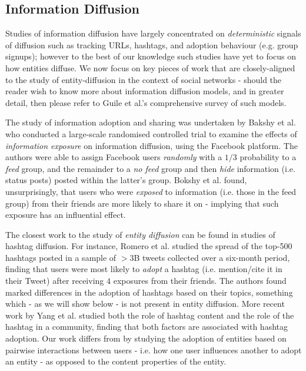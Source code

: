 \documentclass[10pt,journal,compsoc]{IEEEtran}
\begin{document}
\subsection{Information Diffusion}
Studies of information diffusion have largely concentrated on \emph{deterministic} signals of diffusion such as tracking URLs, hashtags, and adoption behaviour (e.g. group signups); however to the best of our knowledge such studies have yet to focus on how entities diffuse.
We now focus on key pieces of work that are closely-aligned to the study of entity-diffusion in the context of social networks - should the reader wish to know more about information diffusion models, and in greater detail, then please refer to Guile et al.'s \cite{guille2013information} comprehensive survey of such models.

The study of information adoption and sharing was undertaken by Bakshy et al. \cite{bakshy2012role} who conducted a large-scale randomised controlled trial to examine the effects of \emph{information exposure} on information diffusion, using the Facebook platform.
The authors were able to assign Facebook users \emph{randomly} with a $1/3$ probability to a \emph{feed} group, and the remainder to a \emph{no feed} group and then \emph{hide} information (i.e. status posts) posted within the latter's group.
Bokshy et al. found, unsurprisingly, that users who were \emph{exposed} to information (i.e. those in the feed group) from their friends are more likely to share it on - implying that such exposure has an influential effect.

The closest work to the study of \emph{entity diffusion} can be found in studies of hashtag diffusion.
For instance, Romero et al. \cite{romero2011differences} studied the spread of the top-500 hashtags posted in a sample of $>3$B tweets collected over a six-month period, finding that users were most likely to \emph{adopt} a hashtag (i.e. mention/cite it in their Tweet) after receiving $4$ exposures from their friends.
The authors found marked differences in the adoption of hashtags based on their topics, something which - as we will show below - is not present in entity diffusion.
More recent work by Yang et al. \cite{yang2012we} studied both the role of hashtag content and the role of the hashtag in a community, finding that both factors are associated with hashtag adoption.
Our work differs from \cite{yang2012we} by studying the adoption of entities based on pairwise interactions between users - i.e. how one user influences another to adopt an entity - as opposed to the content properties of the entity.
\end{document}
